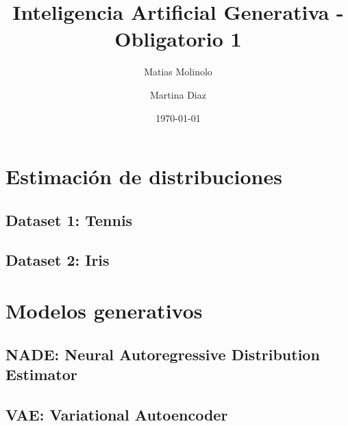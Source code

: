 \documentclass[11pt]{article}
\title{Inteligencia Artificial Generativa - Obligatorio 1}
\author{Matias Molinolo \and Martina Diaz}
\date{\today}
\begin{document}
\maketitle
\thispagestyle{empty}
\newpage
\section{Estimación de distribuciones}
\subsection{Dataset 1: Tennis}

\subsection{Dataset 2: Iris}

\section{Modelos generativos}
\subsection{NADE: Neural Autoregressive Distribution Estimator}
\subsection{VAE: Variational Autoencoder}
\end{document}
